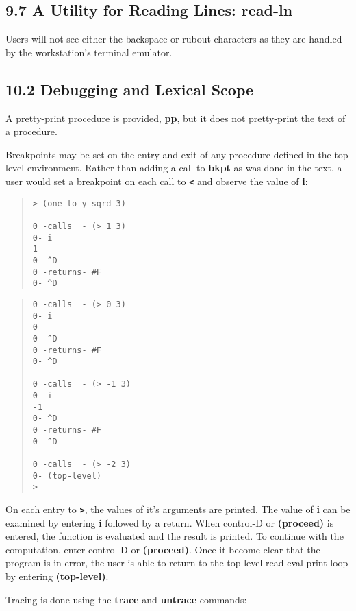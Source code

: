 \documentclass[10pt]{article}
\begin{document}
\subsection*{9.7 A Utility for Reading Lines: read-ln}

Users will not see either the backspace or rubout characters
as they are handled by the workstation's terminal emulator.

\subsection*{10.2 Debugging and Lexical Scope}

A pretty-print procedure is provided, \textbf{pp}, but it does not
pretty-print the text of a procedure.

Breakpoints may be set on the entry and exit of any procedure
defined in the top level environment.  Rather than adding a
call to \textbf{bkpt} as was done in the text, a user would set a
breakpoint on each call to \textbf{\texttt{<}} and observe the value of
\textbf{i}:

\begin{quote}
\begin{verbatim}
> (one-to-y-sqrd 3)

0 -calls  - (> 1 3)
0- i
1
0- ^D
0 -returns- #F
0- ^D
\end{verbatim}
\end{quote}

\begin{quote}
\begin{verbatim}
0 -calls  - (> 0 3)
0- i
0
0- ^D
0 -returns- #F
0- ^D

0 -calls  - (> -1 3)
0- i
-1
0- ^D
0 -returns- #F
0- ^D

0 -calls  - (> -2 3)
0- (top-level)
>
\end{verbatim}
\end{quote}

On each entry to \textbf{\texttt{>}}, the values of it's arguments are
printed.  The value of \textbf{i} can be examined by entering \textbf{i}
followed by a return.  When control-D or \textbf{(proceed)} is
entered, the function is evaluated and the result is printed.
To continue with the computation, enter control-D or
\textbf{(proceed)}.  Once it become clear that the program is in
error, the user is able to return to the top level
read-eval-print loop by entering \textbf{(top-level)}.

Tracing is done using the \textbf{trace} and \textbf{untrace} commands:
\end{document}
